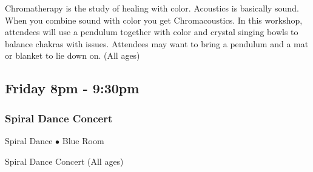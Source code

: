  Chromatherapy is the study of healing with color. Acoustics is basically sound. When you combine sound with color you get Chromacoustics. In this workshop, attendees will use a pendulum together with color and crystal singing bowls to balance chakras with issues. Attendees may want to bring a pendulum and a mat or blanket to lie down on. {\small (All ages)}

\subsection{Friday 8pm - 9:30pm}

\subsubsection{Spiral Dance Concert}
\label{Fri-Concert1}
{\small Spiral Dance $\bullet$  Blue Room}

 Spiral Dance Concert {\small (All ages)}